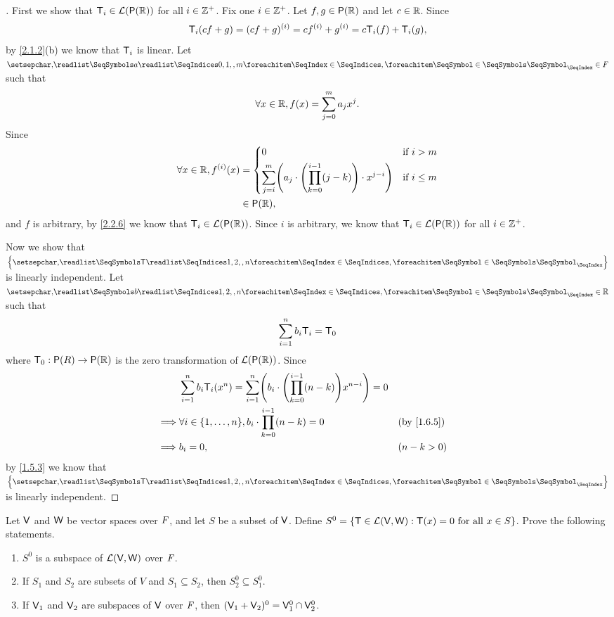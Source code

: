 \begin{proof}[]
  First we show that \(\T_i \in \ls(\ps{\R})\) for all \(i \in \mathbb{Z}^+\).
  Fix one \(i \in \mathbb{Z}^+\).
  Let \(f, g \in \ps{\R}\) and let \(c \in \mathbb{R}\).
  Since
  \[
    \mathsf{T}_i(cf + g) = (cf + g)^{(i)} = c f^{(i)} + g^{(i)} = c \mathsf{T}_i(f) + \mathsf{T}_i(g),
  \]
  by \cref{2.1.2}(b) we know that \(\mathsf{T}_i\) is linear.
  Let \(\seq{a}{0,1,,m} \in \F\) such that
  \[
    \forall x \in \mathbb{R}, f(x) = \sum_{j = 0}^m a_j x^j.
  \]
  Since
  \begin{align*}
    \forall x \in \R, f^{(i)}(x) & = \begin{dcases}
                                       0                                                                                & \text{if } i > m    \\
                                       \sum_{j = i}^m \pa{a_j \cdot \pa{\prod_{k = 0}^{i - 1} (j - k)} \cdot x^{j - i}} & \text{if } i \leq m
                                     \end{dcases} \\
                                 & \in \ps{\R},
  \end{align*}
  and \(f\) is arbitrary, by \cref{2.2.6} we know that \(\T_i \in \ls(\ps{\R})\).
  Since \(i\) is arbitrary, we know that \(\T_i \in \ls(\ps{\R})\) for all \(i \in \mathbb{Z}^+\).

  Now we show that \(\set{\seq{\T}{1,2,,n}}\) is linearly independent.
  Let \(\seq{b}{1,2,,n} \in \R\) such that
  \[
    \sum_{i = 1}^n b_i \mathsf{T}_i = \mathsf{T}_0
  \]
  where \(\zT : \ps{R} \to \ps{\R}\) is the zero transformation of \(\ls(\ps{\R})\).
  Since
  \begin{align*}
             & \sum_{i = 1}^n b_i \T_i(x^n) = \sum_{i = 1}^n \pa{b_i \cdot \pa{\prod_{k = 0}^{i - 1} (n - k)} x^{n - i}} = 0                               \\
    \implies & \forall i \in \set{1, \dots, n}, b_i \cdot \prod_{k = 0}^{i - 1} (n - k) = 0                                  &  & \text{(by \cref{1.6.5})} \\
    \implies & b_i = 0,                                                                                                      &  & (n - k > 0)
  \end{align*}
  by \cref{1.5.3} we know that \(\set{\seq{\T}{1,2,,n}}\) is linearly independent.
\end{proof}

\begin{ex}\label{ex:2.2.15}
  Let \(\mathsf{V}\) and \(\mathsf{W}\) be vector spaces over \(\mathit{F}\), and let \(S\) be a subset of \(\mathsf{V}\).
  Define \(S^0 = \left\lbrace\mathsf{T} \in \mathcal{L}(\mathsf{V}, \mathsf{W}) : \mathsf{T}(x) = 0 \text{ for all } x \in S\right\rbrace\).
  Prove the following statements.
  \begin{enumerate}
    \item \(S^0\) is a subspace of \(\mathcal{L}(\mathsf{V}, \mathsf{W})\) over \(\mathit{F}\).
    \item If \(S_1\) and \(S_2\) are subsets of \(V\) and \(S_1 \subseteq S_2\), then \(S_2^0 \subseteq S_1^0\).
    \item If \(\mathsf{V}_1\) and \(\mathsf{V}_2\) are subspaces of \(\mathsf{V}\) over \(\mathit{F}\), then \((\mathsf{V}_1 + \mathsf{V}_2)^0 = \mathsf{V}_1^0 \cap \mathsf{V}_2^0\).
  \end{enumerate}
\end{ex}

